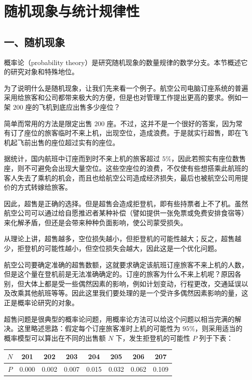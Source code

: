 \documentclass[../../main.tex]{subfiles}
\begin{document}
\section{随机现象与统计规律性}\label{section:ch01-随机现象与统计规律性}

\subsection*{一、随机现象}

概率论（probability theory）是研究随机现象的数量规律的数学分支。本节概述它的研究对象和特殊地位。

为了说明什么是随机现象，让我们先来看一个例子。航空公司电脑订座系统的普遍采用给旅客和公司都带来极大的方便，但是也对管理工作提出更高的要求。例如一架 $200$ 座的飞机到底应出售多少座位？

简单而常用的方法是限定出售 $200$ 座。不过，这并不是一个很好的答案，因为常有订了座位的旅客临时不来上机，出现空位，造成浪费。于是就实行超售，即在飞机起飞前出售的座位超过实有的座位。

据统计，国内航班中订座而到时不来上机的旅客超过 $5\%$，因此若照实有座位数售座，则不可避免会出现大量空位。这些空座位的浪费，不仅使有些想搭乘此航班的客人失去了乘机的机会，而且也给航空公司造成经济损失，最后也被航空公司用提价的方式转嫁给旅客。

因此，超售是正确的选择。但是超售会造成拒登机，即有些持票者上不了机。虽然航空公司可以通过给自愿推迟者某种补偿（譬如提供一张免票或免费安排食宿等）来化解矛盾，但还是会带来种种负面影响，使公司蒙受损失。

从理论上讲，超售越多，空位损失越小，但拒登机的可能性越大；反之，超售越少，拒登机的可能性越小，但空位损失会越大，因此这是一个优化问题。

航空公司要确定准确的超售数额，这就要求确定该航班订座旅客不来上机的人数，但是这个量在登机前是无法准确确定的。订座的旅客为什么不来上机呢？原因各别，但大体上都是受一些偶然因素的影响，例如计划变动，行程更改，交通延误以及改乘其他航班等等。因此这里我们要处理的是一个受许多偶然因素影响的量，这正是概率论研究的对象。

超售问题是很典型的概率论问题，用概率论方法可以给这个问题以相当完满的解决。这里略述思路：假定每个订座旅客准时上机的可能性为 $95\%$，则采用适当的概率模型可以算出在不同的出售额 $N$ 下，发生拒登机的可能性 $P$ 列于下表：

\begin{center}
\begin{tabular}{c|ccccccc}
$N$ & 201 & 202 & 203 & 204 & 205 & 206 & 207 \\
\hline
$P$ & 0.000 & 0.002 & 0.007 & 0.015 & 0.032 & 0.062 & 0.109
\end{tabular}
\end{center}
\end{document}

